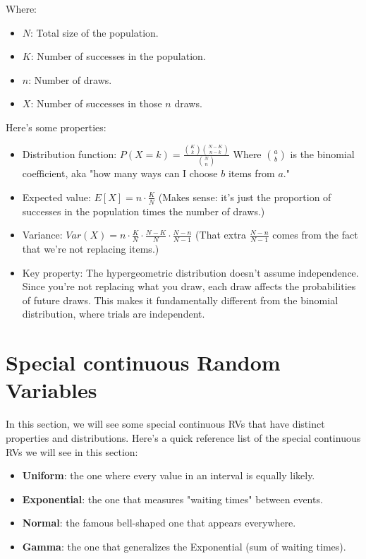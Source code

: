 \documentclass[a4paper]{article}
\newenvironment{focus}{\begin{focusbox}}{\end{focusbox}}
\begin{document}
Where:
\begin{itemize}[label=$\circ$, itemsep=-0.2cm]
    \item \(N\): Total size of the population.
    \item \(K\): Number of successes in the population.
    \item \(n\): Number of draws.
    \item \(X\): Number of successes in those \(n\) draws.
\end{itemize}

Here's some properties:
\begin{itemize}
    \item Distribution function: 
    $ P(X = k) = \frac{\binom{K}{k} \binom{N-K}{n-k}}{\binom{N}{n}} $
    Where \( \binom{a}{b} \) is the binomial coefficient, aka "how many ways can I choose \(b\) items from \(a\)."

    \item Expected value: 
    $ E[X] = n \cdot \frac{K}{N} $
    (Makes sense: it's just the proportion of successes in the population times the number of draws.)

    \item Variance: 
    $ Var(X) = n \cdot \frac{K}{N} \cdot \frac{N-K}{N} \cdot \frac{N-n}{N-1} $
    (That extra \(\frac{N-n}{N-1}\) comes from the fact that we're not replacing items.)

    \item Key property: The hypergeometric distribution doesn’t assume independence. Since you’re not replacing what you draw, each draw affects the probabilities of future draws. This makes it fundamentally different from the binomial distribution, where trials are independent.

\end{itemize}


\section{Special continuous Random Variables}
In this section, we will see some special continuous RVs that have distinct properties and distributions.
Here's a quick reference list of the special continuous RVs we will see in this section:
\begin{focus}\begin{itemize}
    \item \textbf{Uniform}: the one where every value in an interval is equally likely.
    \item \textbf{Exponential}: the one that measures "waiting times" between events.
    \item \textbf{Normal}: the famous bell-shaped one that appears everywhere.
    \item \textbf{Gamma}: the one that generalizes the Exponential (sum of waiting times).
\end{itemize}
\end{focus}
\end{document}
